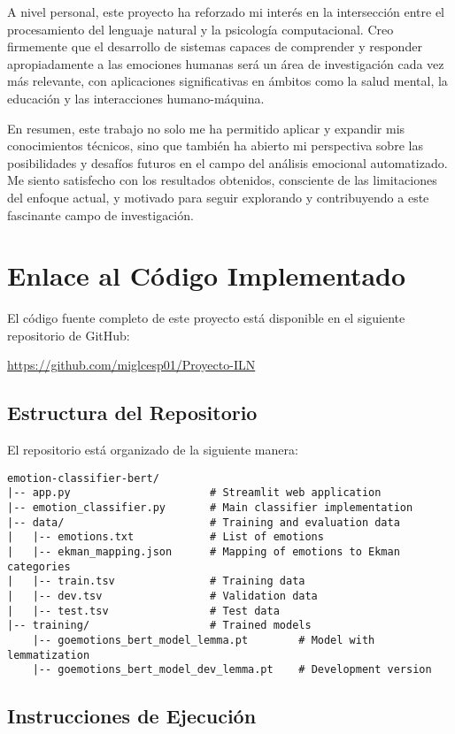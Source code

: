 \documentclass[12pt,a4paper]{report}
\begin{document}
A nivel personal, este proyecto ha reforzado mi interés en la intersección entre el procesamiento del lenguaje natural y la psicología computacional. Creo firmemente que el desarrollo de sistemas capaces de comprender y responder apropiadamente a las emociones humanas será un área de investigación cada vez más relevante, con aplicaciones significativas en ámbitos como la salud mental, la educación y las interacciones humano-máquina.

En resumen, este trabajo no solo me ha permitido aplicar y expandir mis conocimientos técnicos, sino que también ha abierto mi perspectiva sobre las posibilidades y desafíos futuros en el campo del análisis emocional automatizado. Me siento satisfecho con los resultados obtenidos, consciente de las limitaciones del enfoque actual, y motivado para seguir explorando y contribuyendo a este fascinante campo de investigación.

\chapter{Enlace al Código Implementado}

El código fuente completo de este proyecto está disponible en el siguiente repositorio de GitHub:

\url{https://github.com/miglcesp01/Proyecto-ILN}

\section{Estructura del Repositorio}

El repositorio está organizado de la siguiente manera:

\begin{lstlisting}
emotion-classifier-bert/
|-- app.py                      # Streamlit web application
|-- emotion_classifier.py       # Main classifier implementation
|-- data/                       # Training and evaluation data
|   |-- emotions.txt            # List of emotions
|   |-- ekman_mapping.json      # Mapping of emotions to Ekman categories 
|   |-- train.tsv               # Training data
|   |-- dev.tsv                 # Validation data
|   |-- test.tsv                # Test data
|-- training/                   # Trained models
    |-- goemotions_bert_model_lemma.pt        # Model with lemmatization
    |-- goemotions_bert_model_dev_lemma.pt    # Development version
\end{lstlisting}

\section{Instrucciones de Ejecución}
\end{document}
